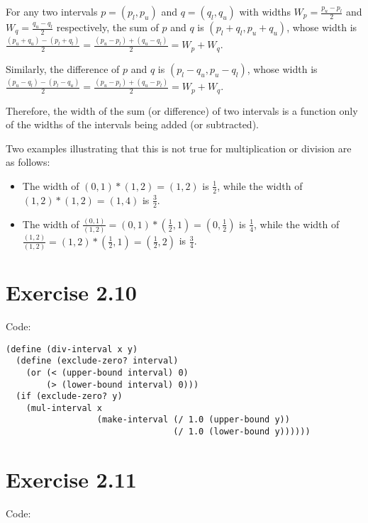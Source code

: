 \documentclass[../main.tex]{subfiles}
\begin{document}
For any two intervals $p=(p_l, p_u)$
 and $q=(q_l, q_u)$ with widths $W_p = \frac{p_u - p_l}{2}$
 and $W_q = \frac{q_u - q_l}{2}$
 respectively, the sum of $p$ and $q$ is
 $(p_l + q_l, p_u + q_u)$, whose width is
 $\frac{(p_u + q_u) - (p_l + q_l)}{2} =
 \frac{(p_u - p_l) + (q_u - q_l)}{2} = W_p + W_q$.

Similarly, the difference of $p$ and $q$ is
 $(p_l - q_u, p_u - q_l)$, whose width is
 $\frac{(p_u - q_l) - (p_l - q_u)}{2} = 
 \frac{(p_u - p_l) + (q_u - p_l)}{2} = W_p + W_q$.

Therefore, the width of the sum (or difference) of two
 intervals is a function only of the widths of the intervals
 being added (or subtracted).

Two examples illustrating that this is not true for
 multiplication or division are as follows:

\begin{itemize}
\item The width of $(0, 1) * (1, 2) = (1, 2)$ is $\frac{1}{2}$,
 while the width of $(1, 2) * (1, 2) = (1, 4)$ is $\frac{3}{2}$.
\item The width of $\frac{(0, 1)}{(1, 2)} = (0, 1) *
 (\frac{1}{2}, 1) = (0, \frac{1}{2})$ is $\frac{1}{4}$,
 while the width of $\frac{(1, 2)}{(1, 2)} = (1, 2) *
 (\frac{1}{2}, 1) = (\frac{1}{2}, 2)$ is $\frac{3}{4}$.
\end{itemize}

\section{Exercise 2.10}

Code:

\begin{lstlisting}
(define (div-interval x y)
  (define (exclude-zero? interval)
    (or (< (upper-bound interval) 0)
        (> (lower-bound interval) 0)))
  (if (exclude-zero? y)
    (mul-interval x
                  (make-interval (/ 1.0 (upper-bound y))
                                 (/ 1.0 (lower-bound y))))))
\end{lstlisting}

\section{Exercise 2.11}

Code:
\end{document}

